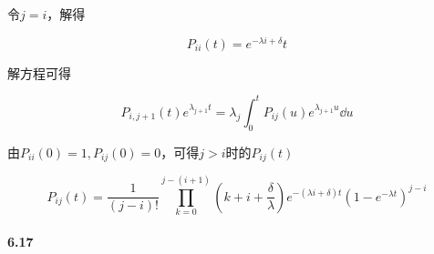 \documentclass{../notes}
\begin{document}
    令$j = i$，解得

    \begin{equation}
        P_{ii}(t) = e^{-\lambda i + \delta}t
    \end{equation}

    解方程可得

    \begin{equation}
        P_{i, j+1}(t) e^{\lambda_{j+1}t} = \lambda_j \int_{0}^t P_{ij}(u)e^{\lambda_{j+1}u}\dd u
    \end{equation}

    由$P_{ii}(0) = 1, P_{ij}(0) = 0$，可得$j > i$时的$P_{ij}(t)$

    \begin{equation}
        P_{ij}(t) = \frac{1}{(j-i)!}\prod_{k=0}^{j-(i+1)}\left(k+i+\frac{\delta}{\lambda}\right)e^{-(\lambda i + \delta)t}\left(1 - e^{-\lambda t}\right)^{j-i}
    \end{equation}

    \paragraph*{6.17}
\end{document}

